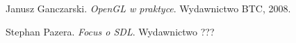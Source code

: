 \documentclass[12pt, a4paper, oneside]{Thesis} %
\begin{document}
\pagestyle{fancy}



\tableofcontents 



\mainmatter 

\pagestyle{fancy} 







\listoffigures %

\backmatter

\begin{thebibliography}{1}

Janusz Ganczarski. 
\emph{OpenGL w praktyce}. Wydawnictwo BTC, 2008.

Stephan Pazera. 
\emph{Focus o SDL}. Wydawnictwo ???

\end{thebibliography}
\end{document}
